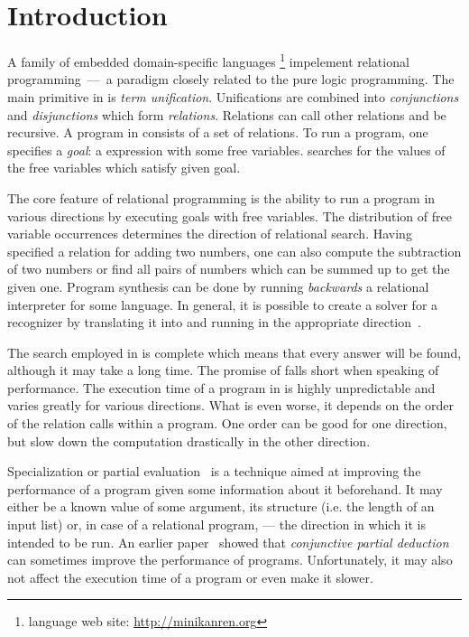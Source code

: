 \section{Introduction}

A family of embedded domain-specific languages \mk\footnote{\mk language web site: \url{http://minikanren.org}} impelement relational programming~---~a paradigm closely related to the pure logic programming.
The main primitive in \mk is \emph{term unification}.
Unifications are combined into \emph{conjunctions} and \emph{disjunctions} which form \emph{relations}.
Relations can call other relations and be recursive.
A program in \mk consists of a set of relations.
To run a \mk program, one specifies a \emph{goal}: a \mk expression with some free variables.
\mk searches for the values of the free variables which satisfy given goal.

The core feature of relational programming is the ability to run a program in various directions by executing goals with free variables.
The distribution of free variable occurrences determines the direction of relational search.
Having specified a relation for adding two numbers, one can also compute the subtraction of two numbers or find all pairs of numbers which can be summed up to get the given one.
Program synthesis can be done by running \emph{backwards} a relational interpreter for some language.
In general, it is possible to create a solver for a recognizer by translating it into \mk and running in the appropriate direction~\cite{lozov2019relational}.

The search employed in \mk is complete which means that every answer will be found, although it may take a long time.
The promise of \mk falls short when speaking of performance.
The execution time of a program in \mk is highly unpredictable and varies greatly for various directions.
What is even worse, it depends on the order of the relation calls within a program.
One order can be good for one direction, but slow down the computation drastically in the other direction.

Specialization or partial evaluation~\cite{jonesbook} is a technique aimed at improving the performance of a program given some information about it beforehand.
It may either be a known value of some argument, its structure (i.e. the length of an input list) or, in case of a relational program, --- the direction in which it is intended to be run.
An earlier paper~\cite{lozov2019relational} showed that \emph{conjunctive partial deduction}~\cite{de1999conjunctive} can sometimes improve the performance of \mk programs.
Unfortunately, it may also not affect the execution time of a program or even make it slower.

